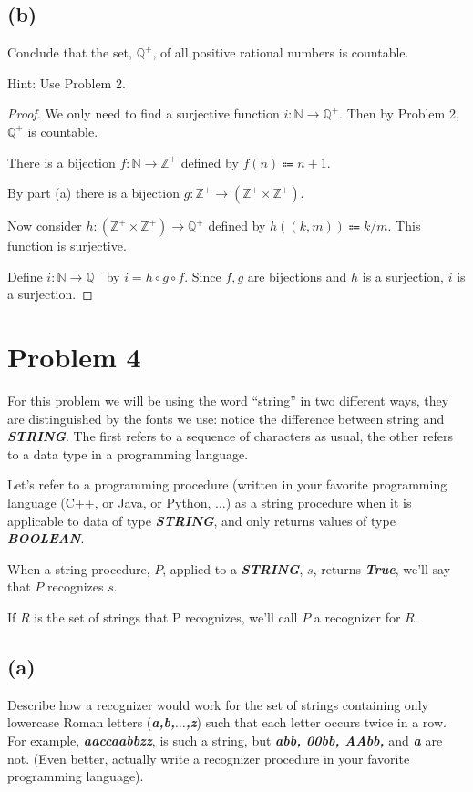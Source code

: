 \documentclass[14pt]{extarticle}
\newcommand{\str}[1]{\textit{\textbf{#1}}}
\begin{document}
\subsection{(b)}
Conclude that the set, $\mathbb{Q}^+$, of all positive rational numbers is countable.

Hint: Use Problem 2.
\begin{proof}
We only need to find a surjective function $i: \mathbb{N} \to \mathbb{Q}^+$. Then by Problem 2, $\mathbb{Q}^+$ is countable.

There is a bijection $f: \mathbb{N} \to \mathbb{Z}^+$ defined by $f(n) \Coloneqq n+1$.

By part (a) there is a bijection $g: \mathbb{Z}^+ \to (\mathbb{Z}^+ \times \mathbb{Z}^+)$.

Now consider $h: (\mathbb{Z}^+ \times \mathbb{Z}^+) \to \mathbb{Q}^+$ defined by $h((k, m)) \Coloneqq k / m$. This function is surjective.

Define $i: \mathbb{N} \to \mathbb{Q}^+$ by $i = h \circ g \circ f$. Since $f, g$ are bijections and $h$ is a surjection, $i$ is a surjection.
\end{proof}

\section{Problem 4}
For this problem we will be using the word ``string'' in two different ways, they are distinguished by the fonts we use: notice the difference between string and \str{STRING}. The first refers to a sequence of characters as usual, the other refers to a data type in a programming language.

Let's refer to a programming procedure (written in your favorite programming language (C++, or Java, or Python, $\ldots$) as a string procedure when it is applicable to data of type \str{STRING}, and only returns values of type \str{BOOLEAN}. 

When a string procedure, $P$, applied to a \str{STRING}, $s$, returns \str{True}, we'll say that $P$ recognizes $s$. 

If $R$ is the set of strings that P recognizes, we'll call $P$ a recognizer for $R$.
\subsection{(a)}
Describe how a recognizer would work for the set of strings containing only lowercase Roman letters (\str{a,b,$\ldots$,z}) such that each letter occurs twice in a row. For example, \str{aaccaabbzz}, is such a string, but \str{abb, 00bb, AAbb,} and \str{a} are not. (Even better, actually write a recognizer procedure in your favorite programming language).
\end{document}
